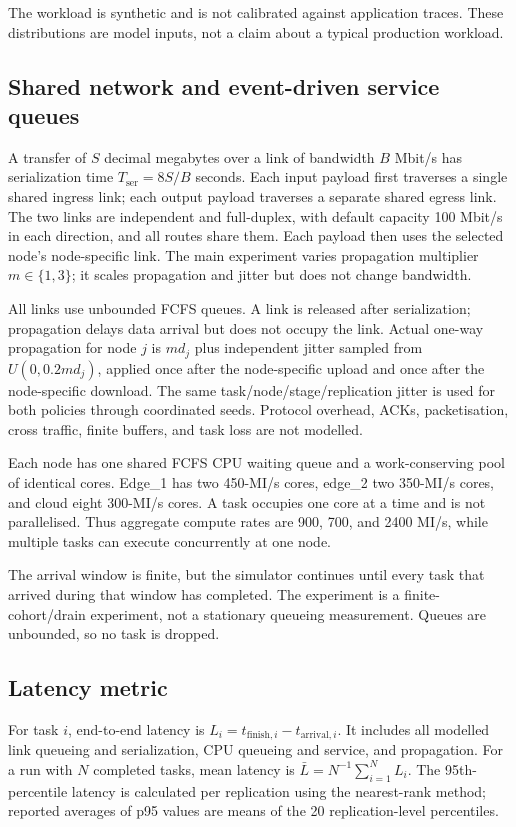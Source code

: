 \documentclass[conference]{IEEEtran}
\begin{document}
The workload is synthetic and is not calibrated against application traces. These distributions are model inputs, not a claim about a typical production workload.

\subsection{Shared network and event-driven service queues}
A transfer of $S$ decimal megabytes over a link of bandwidth $B$ Mbit/s has serialization time $T_{\mathrm{ser}}=8S/B$ seconds. Each input payload first traverses a single shared ingress link; each output payload traverses a separate shared egress link. The two links are independent and full-duplex, with default capacity 100 Mbit/s in each direction, and all routes share them. Each payload then uses the selected node's node-specific link. The main experiment varies propagation multiplier $m\in\{1,3\}$; it scales propagation and jitter but does not change bandwidth.

All links use unbounded FCFS queues. A link is released after serialization; propagation delays data arrival but does not occupy the link. Actual one-way propagation for node $j$ is $m d_j$ plus independent jitter sampled from $U(0,0.2m d_j)$, applied once after the node-specific upload and once after the node-specific download. The same task/node/stage/replication jitter is used for both policies through coordinated seeds. Protocol overhead, ACKs, packetisation, cross traffic, finite buffers, and task loss are not modelled.

Each node has one shared FCFS CPU waiting queue and a work-conserving pool of identical cores. Edge\_1 has two 450-MI/s cores, edge\_2 two 350-MI/s cores, and cloud eight 300-MI/s cores. A task occupies one core at a time and is not parallelised. Thus aggregate compute rates are 900, 700, and 2400 MI/s, while multiple tasks can execute concurrently at one node.

The arrival window is finite, but the simulator continues until every task that arrived during that window has completed. The experiment is a finite-cohort/drain experiment, not a stationary queueing measurement. Queues are unbounded, so no task is dropped.

\subsection{Latency metric}
For task $i$, end-to-end latency is $L_i=t_{\mathrm{finish},i}-t_{\mathrm{arrival},i}$. It includes all modelled link queueing and serialization, CPU queueing and service, and propagation. For a run with $N$ completed tasks, mean latency is $\bar{L}=N^{-1}\sum_{i=1}^{N}L_i$. The 95th-percentile latency is calculated per replication using the nearest-rank method; reported averages of p95 values are means of the 20 replication-level percentiles.
\end{document}
